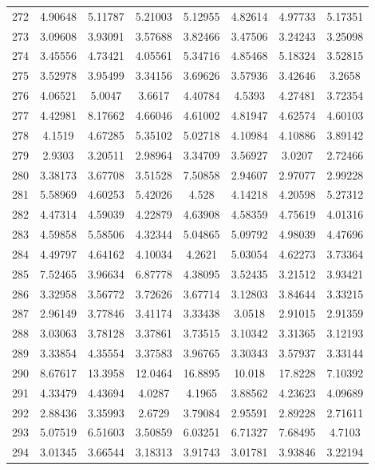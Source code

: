 \begin{center}
\begin{longtable}{cccccccc}
272 & 4.90648 & 5.11787 & 5.21003 & 5.12955 & 4.82614 & 4.97733 & 5.17351\\
273 & 3.09608 & 3.93091 & 3.57688 & 3.82466 & 3.47506 & 3.24243 & 3.25098\\
274 & 3.45556 & 4.73421 & 4.05561 & 5.34716 & 4.85468 & 5.18324 & 3.52815\\
275 & 3.52978 & 3.95499 & 3.34156 & 3.69626 & 3.57936 & 3.42646 & 3.2658\\
276 & 4.06521 & 5.0047 & 3.6617 & 4.40784 & 4.5393 & 4.27481 & 3.72354\\
277 & 4.42981 & 8.17662 & 4.66046 & 4.61002 & 4.81947 & 4.62574 & 4.60103\\
278 & 4.1519 & 4.67285 & 5.35102 & 5.02718 & 4.10984 & 4.10886 & 3.89142\\
279 & 2.9303 & 3.20511 & 2.98964 & 3.34709 & 3.56927 & 3.0207 & 2.72466\\
280 & 3.38173 & 3.67708 & 3.51528 & 7.50858 & 2.94607 & 2.97077 & 2.99228\\
281 & 5.58969 & 4.60253 & 5.42026 & 4.528 & 4.14218 & 4.20598 & 5.27312\\
282 & 4.47314 & 4.59039 & 4.22879 & 4.63908 & 4.58359 & 4.75619 & 4.01316\\
283 & 4.59858 & 5.58506 & 4.32344 & 5.04865 & 5.09792 & 4.98039 & 4.47696\\
284 & 4.49797 & 4.64162 & 4.10034 & 4.2621 & 5.03054 & 4.62273 & 3.73364\\
285 & 7.52465 & 3.96634 & 6.87778 & 4.38095 & 3.52435 & 3.21512 & 3.93421\\
286 & 3.32958 & 3.56772 & 3.72626 & 3.67714 & 3.12803 & 3.84644 & 3.33215\\
287 & 2.96149 & 3.77846 & 3.41174 & 3.33438 & 3.0518 & 2.91015 & 2.91359\\
288 & 3.03063 & 3.78128 & 3.37861 & 3.73515 & 3.10342 & 3.31365 & 3.12193\\
289 & 3.33854 & 4.35554 & 3.37583 & 3.96765 & 3.30343 & 3.57937 & 3.33144\\
290 & 8.67617 & 13.3958 & 12.0464 & 16.8895 & 10.018 & 17.8228 & 7.10392\\
291 & 4.33479 & 4.43694 & 4.0287 & 4.1965 & 3.88562 & 4.23623 & 4.09689\\
292 & 2.88436 & 3.35993 & 2.6729 & 3.79084 & 2.95591 & 2.89228 & 2.71611\\
293 & 5.07519 & 6.51603 & 3.50859 & 6.03251 & 6.71327 & 7.68495 & 4.7103\\
294 & 3.01345 & 3.66544 & 3.18313 & 3.91743 & 3.01781 & 3.93846 & 3.22194\\

\end{longtable}
\end{center}
